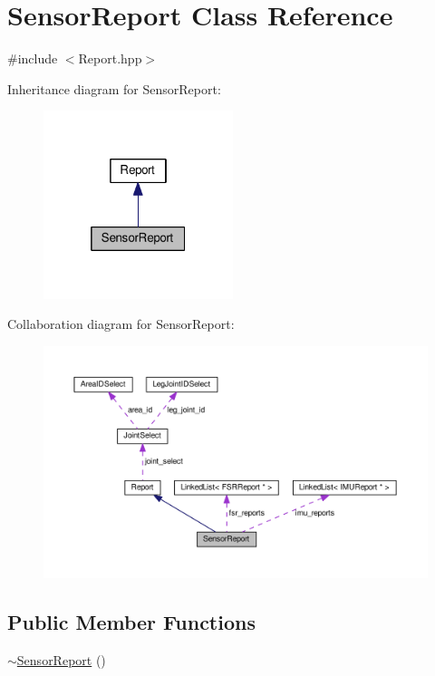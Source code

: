 \hypertarget{classSensorReport}{}\section{Sensor\+Report Class Reference}
\label{classSensorReport}


{\ttfamily \#include $<$Report.\+hpp$>$}



Inheritance diagram for Sensor\+Report\+:\nopagebreak
\begin{figure}[H]
\begin{center}
\leavevmode
\includegraphics[width=157pt]{classSensorReport__inherit__graph}
\end{center}
\end{figure}


Collaboration diagram for Sensor\+Report\+:
\nopagebreak
\begin{figure}[H]
\begin{center}
\leavevmode
\includegraphics[width=350pt]{classSensorReport__coll__graph}
\end{center}
\end{figure}
\subsection*{Public Member Functions}
\begin{DoxyCompactItemize}
\item 
\hyperlink{classSensorReport_a27261103704b10bbd31709e68fd7b378}{$\sim$\+Sensor\+Report} ()
\end{DoxyCompactItemize}
